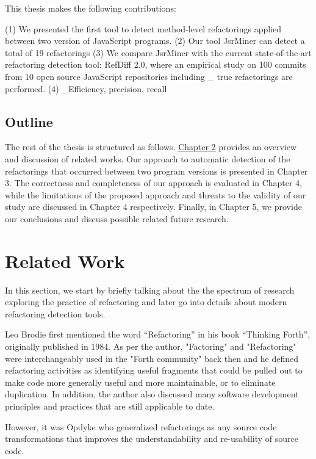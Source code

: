 \documentclass[letterpaper,12pt,onecolumn,final]{report}
\begin{document}
This thesis makes the following contributions:

(1) We presented the first tool to detect method-level refactorings applied between two version of JavaScript programs. 
(2) Our tool JsrMiner can detect a total of 19 refactorings
(3) We compare JsrMiner with the current state-of-the-art refactoring detection tool: RefDiff 2.0, where an empirical study on 100 commits from 10 open source JavaScript repositories including \_ true refactorings are performed.
(4) \_Efficiency, precision, recall


\section{Outline}
\label{sec:outline}
The rest of the thesis is structured as follows. \hyperref[chap:relatedWork]{Chapter 2}  provides an overview and discussion of related works. Our approach to automatic detection of the refactorings that occurred between two program versions is presented in Chapter 3. The correctness and completeness of our approach is evaluated in Chapter 4, while the limitations of the proposed approach and threats to the validity of our study are discussed in Chapter 4 respectively. Finally, in Chapter 5, we provide our conclusions and discuss possible related future research.


\chapter{Related Work}
\label{chap:relatedwork}

In this section, we start by briefly talking about the the spectrum of research exploring the practice of refactoring and later go into details about modern refactoring detection tools.

Leo Brodie \cite{thinkingforth} first mentioned the word “Refactoring” in his book “Thinking Forth”, originally published in 1984. As per the author, "Factoring" and "Refactoring" were interchangeably used in the "Forth community" back then and he defined refactoring activities as identifying useful fragments that could be pulled out to make code more generally useful and more maintainable, or to eliminate duplication. In addition, the author also discussed many software development principles and practices that are still applicable to date.

However, it was Opdyke \cite{OPDYKE1990} who generalized refactorings as any source code transformations that improves the understandability and re-usability of source code.
\end{document}
